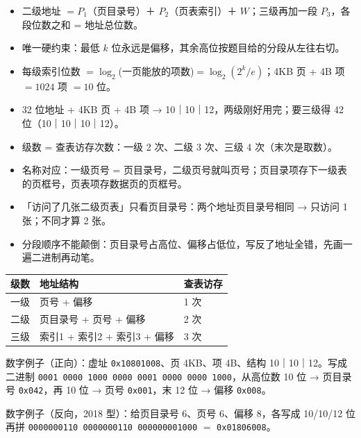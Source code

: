\documentclass[10pt,a4paper]{ctexart}
\begin{document}
\begin{itemize}

\item 二级地址 $=P_1$（页目录号）＋ $P_2$（页表索引）＋ $W$；三级再加一段 $P_3$，各段位数之和 = 地址总位数。

\item 唯一硬约束：最低 $k$ 位永远是偏移，其余高位按题目给的分段从左往右切。

\item 每级索引位数 $=\log_2$(一页能放的项数)$=\log_2(2^k/e)$；4KB 页 + 4B 项 $=1024$ 项 $=10$ 位。

\item 32 位地址 + 4KB 页 + 4B 项 → 10｜10｜12，两级刚好用完；要三级得 42 位（10｜10｜10｜12）。

\item 级数 = 查表访存次数：一级 2 次、二级 3 次、三级 4 次（末次是取数）。

\item 名称对应：一级页号 = 页目录号，二级页号就叫页号；页目录项存下一级表的页框号，页表项存数据页的页框号。

\item 「访问了几张二级页表」只看页目录号：两个地址页目录号相同 → 只访问 1 张；不同才算 2 张。

\item 分段顺序不能颠倒：页目录号占高位、偏移占低位，写反了地址全错，先画一遍二进制再动笔。

\end{itemize}

\begin{center}\small
\begin{tabularx}{\linewidth}{@{}c>{\raggedright\arraybackslash}Xl@{}}
\toprule
级数 & 地址结构 & 查表访存 \\
\midrule
一级 & 页号 + 偏移 & 1 次 \\
二级 & 页目录号 + 页号 + 偏移 & 2 次 \\
三级 & 索引1 + 索引2 + 索引3 + 偏移 & 3 次 \\
\bottomrule
\end{tabularx}
\end{center}

数字例子（正向）：虚址 \texttt{0x10801008}、页 4KB、项 4B、结构 10｜10｜12。写成二进制 \texttt{0001 0000 1000 0000 0001 0000 0000 1000}，从高位数 10 位 → 页目录号 \texttt{0x042}，再 10 位 → 页号 \texttt{0x001}，末 12 位 → 偏移 \texttt{0x008}。

数字例子（反向，2018 型）：给页目录号 6、页号 6、偏移 8，各写成 10/10/12 位再拼 \texttt{0000000110 0000000110 000000001000} $=$ \texttt{0x01806008}。
\end{document}
